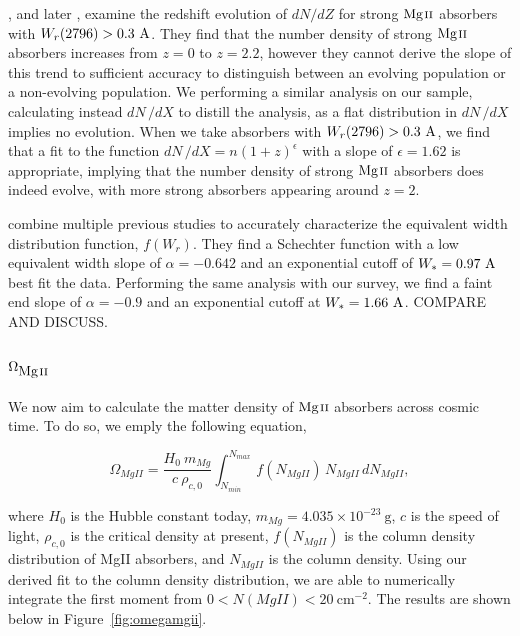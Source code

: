 \documentclass[iop,apj,numberedappendix,appendixfloats,twocolappendix]{emulateapj}
\begin{document}
\cite{Steidel1992}, and later \cite{Churchill2001}, examine the redshift evolution of $dN\!/dZ$ for strong ${\hbox{{\rm Mg}\kern 0.1em{\sc ii}}}$ absorbers with $W_r(2796) > 0.3~\mathrm{\AA}$. They find that the number density of strong ${\hbox{{\rm Mg}\kern 0.1em{\sc ii}}}$ absorbers increases from $z = 0$ to $z = 2.2$, however they cannot derive the slope of this trend to sufficient accuracy to distinguish between an evolving population or a non-evolving population. We performing a similar analysis on our sample, calculating instead $dN\,/dX$ to distill the analysis, as a flat distribution in $dN\,/dX$ implies no evolution. When we take absorbers with $W_r(2796) > 0.3~\mathrm{\AA}$, we find that a fit to the function $dN\,/dX = n(1+z)^{\epsilon}$ with a slope of $\epsilon = 1.62$ is appropriate, implying that the number density of strong ${\hbox{{\rm Mg}\kern 0.1em{\sc ii}}}$ absorbers does indeed evolve, with more strong absorbers appearing around $z = 2$.

\cite{Kacprzak2011MgII} combine multiple previous studies to accurately characterize the equivalent width distribution function, $f(W_r)$. They find a Schechter function with a low equivalent width slope of $\alpha = -0.642$ and an exponential cutoff of $W_* = 0.97~\mathrm{\AA}$ best fit the data. Performing the same analysis with our survey, we find a faint end slope of $\alpha = -0.9$ and an exponential cutoff at $W_* = 1.66~\mathrm{\AA}$. COMPARE AND DISCUSS.


\subsection{$\Omega_{\hbox{{\rm Mg}\kern 0.1em{\sc ii}}}$}
\label{omegamgii}

We now aim to calculate the matter density of ${\hbox{{\rm Mg}\kern 0.1em{\sc ii}}}$ absorbers across cosmic time. To do so, we emply the following equation,

\begin{equation}
\Omega_{MgII} = \frac{H_0\  m_{Mg}}{c\ \rho_{c,0}} \int_{N_{min}}^{N_{max}}\, f (N_{MgII})\, N_{MgII}\, dN_{MgII} ,
\label{eqn:omega}
\end{equation}

where $H_0$ is the Hubble constant today, $m_{Mg} = 4.035 \times 10^{-23}~\mathrm{g}$, $c$ is the speed of light, $\rho_{c,0}$ is the critical density at present, $f(N_{MgII})$ is the column density distribution of {MgII} absorbers, and $N_{MgII}$ is the column density. Using our derived fit to the column density distribution, we are able to numerically integrate the first moment from $0 < N(MgII) < 20~\mathrm{cm^{-2}}$. The results are shown below in Figure~\ref{fig:omegamgii}. 
\end{document}
